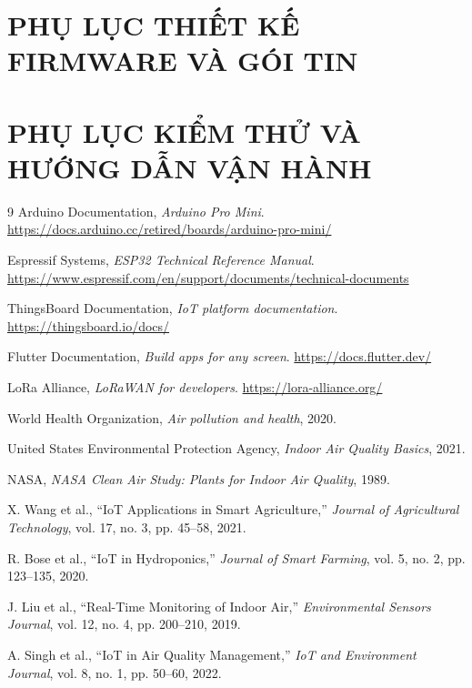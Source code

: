 \documentclass[14pt,a4paper]{report}
\begin{document}
\appendix
\chapter{PHỤ LỤC THIẾT KẾ FIRMWARE VÀ GÓI TIN}


\chapter{PHỤ LỤC KIỂM THỬ VÀ HƯỚNG DẪN VẬN HÀNH}


\begin{thebibliography}{9}
Arduino Documentation, \textit{Arduino Pro Mini}.
\url{https://docs.arduino.cc/retired/boards/arduino-pro-mini/}

Espressif Systems, \textit{ESP32 Technical Reference Manual}.
\url{https://www.espressif.com/en/support/documents/technical-documents}

ThingsBoard Documentation, \textit{IoT platform documentation}.
\url{https://thingsboard.io/docs/}

Flutter Documentation, \textit{Build apps for any screen}.
\url{https://docs.flutter.dev/}

LoRa Alliance, \textit{LoRaWAN for developers}.
\url{https://lora-alliance.org/}

World Health Organization, \textit{Air pollution and health}, 2020.

United States Environmental Protection Agency, \textit{Indoor Air Quality Basics}, 2021.

NASA, \textit{NASA Clean Air Study: Plants for Indoor Air Quality}, 1989.

X. Wang et al., ``IoT Applications in Smart Agriculture,'' \textit{Journal of Agricultural Technology}, vol. 17, no. 3, pp. 45--58, 2021.

R. Bose et al., ``IoT in Hydroponics,'' \textit{Journal of Smart Farming}, vol. 5, no. 2, pp. 123--135, 2020.

J. Liu et al., ``Real-Time Monitoring of Indoor Air,'' \textit{Environmental Sensors Journal}, vol. 12, no. 4, pp. 200--210, 2019.

A. Singh et al., ``IoT in Air Quality Management,'' \textit{IoT and Environment Journal}, vol. 8, no. 1, pp. 50--60, 2022.


\end{thebibliography}
\end{document}
